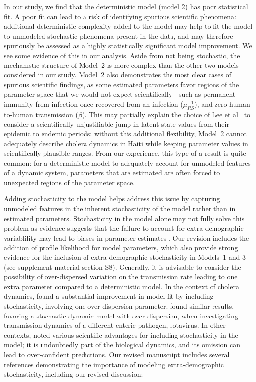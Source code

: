 \documentclass[11pt]{article}
\newcommand\muRS{\mu_{RS}}
\newcommand\transmission{\beta}
\begin{document}
In our study, we find that the deterministic model (model 2) has poor statistical fit.
A poor fit can lead to a risk of identifying spurious scientific phenomena: additional deterministic complexity added to the model may help to fit the model to unmodeled stochastic phenomena present in the data, and may therefore spuriously be assessed as a highly statistically significant model improvement.
We see some evidence of this in our analysis.
Aside from not being stochastic, the mechanistic structure of Model~2 is more complex than the other two models considered in our study.
Model~2 also demonstrates the most clear cases of spurious scientific findings, as some estimated parameters favor regions of the parameter space that we would not expect scientifically---such as permanent immunity from infection once recovered from an infection ($\muRS^{-1}$), and zero human-to-human transmission ($\transmission$).
This may partially explain the choice of Lee et al~\cite{lee20} to consider a scientifically unjustifiable jump in latent state values from their epidemic to endemic periods: without this additional flexibility, Model~2 cannot adequately describe cholera dynamics in Haiti while keeping parameter values in scientifically plausible ranges.
From our experience, this type of a result is quite common: for a deterministic model to adequately account for unmodeled features of a dynamic system, parameters that are estimated are often forced to unexpected regions of the parameter space.

Adding stochasticity to the model helps address this issue by capturing unmodeled features in the inherent stochasticity of the model rather than in estimated parameters.
Stochasticity in the model alone may not fully solve this problem as evidence suggests that the failure to account for extra-demographic variablility may lead to biases in parameter estimates \cite{he10}.
Our revision includes the addition of profile likelihood for model parameters, which also provide strong evidence for the inclusion of extra-demographic stochasticity in Models~1 and 3 (see supplement material section S8).
Generally, it is advisable to consider the possibility of over-dispersed variation on the transmission rate \cite{breto09,he10} leading to one extra parameter compared to a deterministic model.
In the context of cholera dynamics, \cite{lemaitre19} found a substantial improvement in model fit by including stochasticity, involving one over-dispersion parameter.
\cite{stocks20} found similar results, favoring a stochastic dynamic model with over-dispersion, when investigating transmission dynamics of a different enteric pathogen, rotavirus.
In other contexts, \cite{king15} noted various scientific advantages for including stochasticity in the model; it is undoubtedly part of the biological dynamics, and its omission can lead to over-confident predictions.
Our revised manuscript includes several references demonstrating the importance of modeling extra-demographic stochasticity, including our revised discussion:
\end{document}
